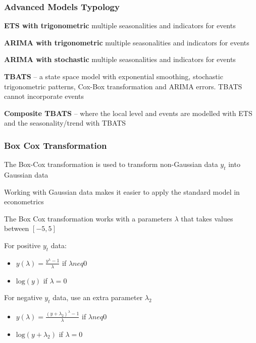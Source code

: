 \documentclass{beamer}
\newenvironment{wideitemize}{\itemize\addtolength{\itemsep}{10pt}}{\enditemize}
\begin{document}
  \begin{frame}
    \frametitle{Advanced Models Typology}

  \begin{wideitemize}
    \item \textbf{ETS with trigonometric} multiple seasonalities and indicators for events
    \item \textbf{ARIMA with trigonometric} multiple seasonalities and indicators for events
    \item \textbf{ARIMA with stochastic} multiple seasonalities and indicators for events
    \item \textbf{TBATS} – a state space model with exponential smoothing, stochastic trigonometric patterns, Cox-Box transformation and ARIMA errors. TBATS cannot incorporate events 
    \item \textbf{Composite TBATS} – where the local level and events are modelled with ETS and the seasonality/trend with TBATS
    \end{wideitemize}
    
  \end{frame}
  

    \begin{frame}
      \frametitle{Box Cox Transformation}

      \begin{wideitemize}
        \item The Box-Cox transformation is used to transform non-Gaussian data $y_t$ into Gaussian  data
        \item Working with Gaussian data makes it easier to apply the standard model in econometrics
        \item The Box Cox transformation works with a parameters $\lambda$ that takes values between $[-5, 5]$

        \item For positive $y_t$ data:
          \begin{itemize}
          \item $y(\lambda) = \frac{y^{\lambda}-1}{\lambda}$ if $\lambda neq 0$
          \item $\text{log}(y)$ if $\lambda = 0$
          \end{itemize}

        \item For negative $y_t$ data, use an extra parameter $\lambda_2$ 
          \begin{itemize}
          \item $y(\lambda) = \frac{(y + \lambda_2)^{\lambda}-1}{\lambda}$ if $\lambda neq 0$
          \item $\text{log}(y + \lambda_2)$ if $\lambda = 0$
          \end{itemize}          
      \end{wideitemize}      
    \end{frame}
\end{document}
